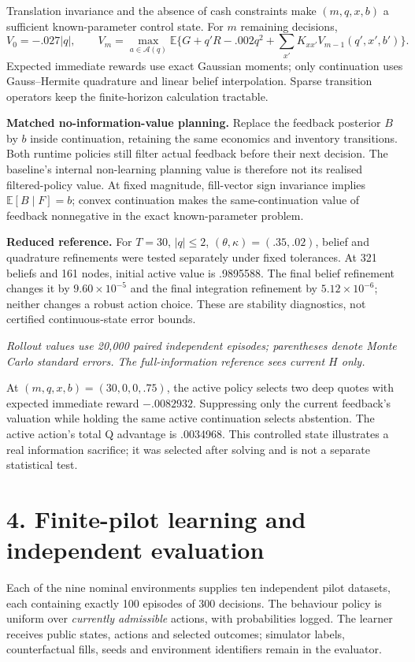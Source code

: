 \documentclass[11pt,a4paper]{article}
\newcommand{\E}{\mathbb E}
\begin{document}
Translation invariance and the absence of cash constraints make $(m,q,x,b)$ a
sufficient known-parameter control state. For $m$ remaining decisions,
\[
V_0=-.027|q|,\qquad
V_m=\max_{a\in\mathcal A(q)}\E\{G+q'R-.002q^2+
\textstyle\sum_{x'}K_{xx'}V_{m-1}(q',x',b')\}.
\]
Expected immediate rewards use exact Gaussian moments; only continuation uses
Gauss--Hermite quadrature and linear belief interpolation. Sparse transition
operators keep the finite-horizon calculation tractable.

\textbf{Matched no-information-value planning.} Replace the feedback posterior
$B$ by $b$ inside continuation, retaining the same economics and inventory
transitions. Both runtime policies still filter actual feedback before their next
decision. The baseline's internal non-learning planning value is therefore not
its realised filtered-policy value. At fixed magnitude, fill-vector sign invariance
implies $\E[B\mid F]=b$; convex continuation makes the same-continuation value of
feedback nonnegative in the exact known-parameter problem.

\textbf{Reduced reference.} For $T=30$, $|q|\le2$, $(\theta,\kappa)=(.35,.02)$,
belief and quadrature refinements were tested separately under fixed tolerances.
At 321 beliefs and 161 nodes, initial active value is .9895588. The final belief
refinement changes it by $9.60\times10^{-5}$ and the final integration refinement
by $5.12\times10^{-6}$; neither changes a robust action choice. These are
stability diagnostics, not certified continuous-state error bounds.


\textit{Rollout values use 20,000 paired independent episodes; parentheses denote
Monte Carlo standard errors. The full-information reference sees current $H$ only.}

At $(m,q,x,b)=(30,0,0,.75)$, the active policy selects two deep quotes with expected
immediate reward $-.0082932$. Suppressing only the current feedback's valuation
while holding the same active continuation selects abstention. The active action's
total Q advantage is .0034968. This controlled state illustrates a real information
sacrifice; it was selected after solving and is not a separate statistical test.

\newpage
\section*{4. Finite-pilot learning and independent evaluation}
Each of the nine nominal environments supplies ten independent pilot datasets,
each containing exactly 100 episodes of 300 decisions. The behaviour policy is
uniform over \emph{currently admissible} actions, with probabilities logged. The
learner receives public states, actions and selected outcomes; simulator labels,
counterfactual fills, seeds and environment identifiers remain in the evaluator.
\end{document}
